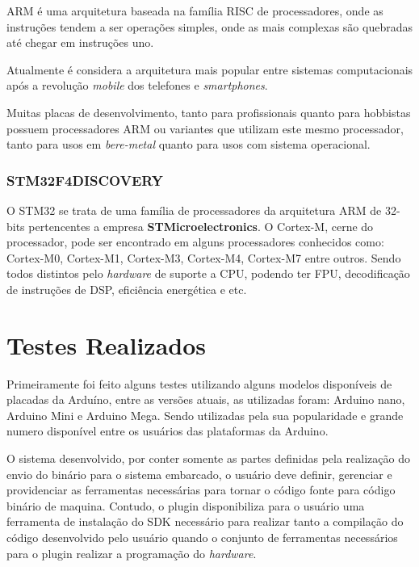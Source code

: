 ARM é uma arquitetura baseada na família RISC de processadores, onde as instruções tendem a ser operações simples, onde as mais complexas são quebradas até chegar em instruções uno.

Atualmente é considera a arquitetura mais popular entre sistemas computacionais após a revolução \textit{mobile} dos telefones e \textit{smartphones}.

Muitas placas de desenvolvimento, tanto para profissionais quanto para hobbistas possuem processadores ARM ou variantes que utilizam este mesmo processador, tanto para usos em \textit{bere-metal} quanto para usos com sistema operacional.


\subsubsection{STM32F4DISCOVERY}

O STM32 se trata de uma família de processadores da arquitetura ARM de 32-bits pertencentes a empresa \textbf{STMicroelectronics}. O Cortex-M, cerne do processador, pode ser encontrado em alguns processadores conhecidos como: Cortex-M0, Cortex-M1, Cortex-M3, Cortex-M4, Cortex-M7 entre outros. Sendo todos distintos pelo \textit{hardware} de suporte a CPU, podendo ter FPU, decodificação de instruções de DSP, eficiência energética e etc.


\section{Testes Realizados}

Primeiramente foi feito alguns testes utilizando alguns modelos disponíveis de placadas da Arduíno, entre as versões atuais, as utilizadas foram: Arduino nano, Arduino Mini e Arduino Mega. Sendo utilizadas pela sua popularidade e grande numero disponível entre os usuários das plataformas da Arduino.

O sistema desenvolvido, por conter somente as partes definidas pela realização do envio do binário para o sistema embarcado, o usuário deve definir, gerenciar e providenciar as ferramentas necessárias para tornar o código fonte para código binário de maquina. Contudo, o plugin disponibiliza para o usuário uma ferramenta de instalação do SDK necessário para realizar tanto a compilação do código desenvolvido pelo usuário quando o conjunto de ferramentas necessários para o plugin realizar a programação do \textit{hardware}.

